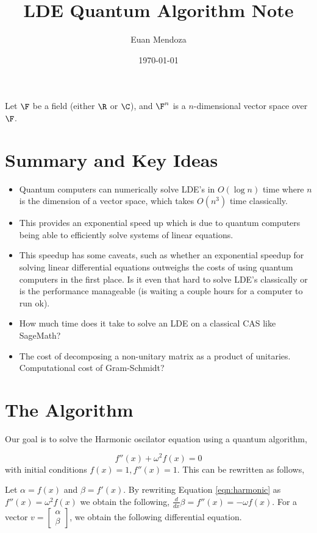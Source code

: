\documentclass[11pt]{article}
\author{Euan Mendoza}
\date{\today}
\title{LDE Quantum Algorithm Note}
\begin{document}
\maketitle
\tableofcontents

Let \(\F\) be a field (either \(\R\) or \(\C\)), and \(\F^{n}\) is a \(n\)-dimensional vector space over \(\F\).
\section{Summary and Key Ideas}
\label{sec:orge8227c5}
\begin{itemize}
\item Quantum computers can numerically solve LDE's in \(O(\log n)\) time where \(n\) is the dimension of a vector space, which takes \(O(n^{3})\) time classically.
\item This provides an exponential speed up which is due to quantum computers being able to efficiently solve systems of linear equations.
\item This speedup has some caveats, such as whether an exponential speedup for solving linear differential equations outweighs the costs of using quantum computers in the first place. Is it even that hard to solve LDE's classically or is the performance manageable (is waiting a couple hours for a computer to run ok).
\item How much time does it take to solve an LDE on a classical CAS like SageMath?
\item The cost of decomposing a non-unitary matrix as a product of unitaries. Computational cost of Gram-Schmidt?
\end{itemize}
\section{The Algorithm}
\label{sec:org9d4f238}
Our goal is to solve the Harmonic oscilator equation using a quantum algorithm,

\begin{equation}
\label{eqn:harmonic}
f''(x) + \omega^{2}f(x) = 0
\end{equation}
with initial conditions \(f(x) = 1, f''(x) = 1\). This can be rewritten as follows,

Let \(\alpha = f(x)\) and \(\beta = f'(x)\). By rewriting Equation \ref{eqn:harmonic} as \(f''(x) = \omega^{2}f(x)\) we obtain the following, \(\frac{d}{dx}\beta = f''(x) = -\omega f(x)\). For a vector \(v = \begin{bmatrix}\alpha \\ \beta \end{bmatrix}\), we obtain the following differential equation.
\end{document}
